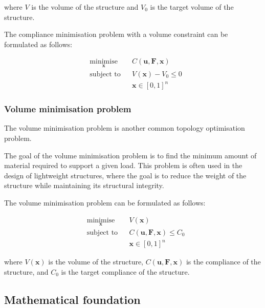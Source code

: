 where $V$ is the volume of the structure and $V_0$ is the target volume of the structure.

The compliance minimisation problem with a volume constraint can be formulated as follows:

\begin{equation}
    \begin{aligned}
         & \underset{\bm{x}}{\text{minimise}} &  & C(\bm{u}, \bm{F}, \bm{x}) \\
         & \text{subject to}                  &  & V(\bm{x}) - V_0 \le 0     \\
         &                                    &  & \bm{x} \in [0, 1]^n
    \end{aligned}
    \label{eq:compliance_minimisation_problem}
\end{equation}


\subsubsection{Volume minimisation problem}
\label{subsubsec:volume_minimisation_problem}

The volume minimisation problem is another common topology optimisation problem.

The goal of the volume minimisation problem is to find the minimum amount of material required to support a given load.
This problem is often used in the design of lightweight structures, where the goal is to reduce the weight of the structure while maintaining its structural integrity.

The volume minimisation problem can be formulated as follows:

\begin{equation}
    \begin{aligned}
         & \underset{\bm{x}}{\text{minimise}} &  & V(\bm{x})                         \\
         & \text{subject to}                  &  & C(\bm{u}, \bm{F}, \bm{x}) \le C_0 \\
         &                                    &  & \bm{x} \in [0, 1]^n
    \end{aligned}
    \label{eq:volume_minimisation_problem}
\end{equation}

where $V(\bm{x})$ is the volume of the structure, $C(\bm{u}, \bm{F}, \bm{x})$ is the compliance of the structure, and $C_0$ is the target compliance of the structure.


\subsection{Mathematical foundation}
\label{subsec:mathematical_foundation}

